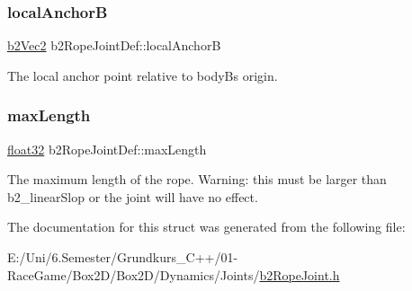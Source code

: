 \subsubsection{\texorpdfstring{localAnchorB}{localAnchorB}}
{\footnotesize\ttfamily \mbox{\hyperlink{structb2_vec2}{b2\+Vec2}} b2\+Rope\+Joint\+Def\+::local\+AnchorB}



The local anchor point relative to bodyB\textquotesingle{}s origin. 

\mbox{\label{structb2_rope_joint_def_a6efdcae22e2bdcfc3aae62da1a5f0d69}} 
\subsubsection{\texorpdfstring{maxLength}{maxLength}}
{\footnotesize\ttfamily \mbox{\hyperlink{b2_settings_8h_aacdc525d6f7bddb3ae95d5c311bd06a1}{float32}} b2\+Rope\+Joint\+Def\+::max\+Length}

The maximum length of the rope. Warning\+: this must be larger than b2\+\_\+linear\+Slop or the joint will have no effect. 

The documentation for this struct was generated from the following file\+:\begin{DoxyCompactItemize}
\item 
E\+:/\+Uni/6.\+Semester/\+Grundkurs\+\_\+\+C++/01-\/\+Race\+Game/\+Box2\+D/\+Box2\+D/\+Dynamics/\+Joints/\mbox{\hyperlink{b2_rope_joint_8h}{b2\+Rope\+Joint.\+h}}\end{DoxyCompactItemize}
